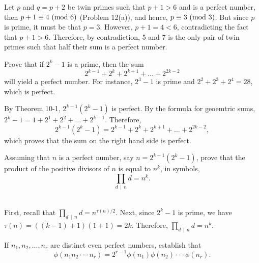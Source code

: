 \begin{solution}
    Let $p$ and $q = p+2$ be twin primes such that $p + 1 > 6$ and is a perfect number, then $p+ 1 \equiv 4 \ (\mathrm{mod}\ 6)$ (Problem 12(a)), and hence, $p \equiv 3 \ (\mathrm{mod}\ 3)$. But since $p$ is prime, it must be that $p = 3$. However, $p + 1 = 4 < 6$, contradicting the fact that $p + 1 > 6$. Therefore, by contradiction, 5 and 7 is the only pair of twin primes such that half their sum is a perfect number. \\
\end{solution}

\begin{exercise}
    Prove that if $2^k - 1$ is a prime, then the sum
    $$2^{k-1} + 2^k + 2^{k+1} + \dots + 2^{2k-2}$$
    will yield a perfect number. For instance, $2^3 - 1$ is prime and $2^2 + 2^3 + 2^4 = 28$, which is perfect. \\
\end{exercise}

\begin{solution}
    By Theorem 10-1, $2^{k-1}(2^k - 1)$ is perfect. By the formula for geoemtric sums, $2^k - 1 = 1 + 2^1 + 2^2 + \dots + 2^{k-1}$. Therefore, 
    $$2^{k-1}(2^k - 1) = 2^{k-1} + 2^k + 2^{k+1} + \dots + 2^{2k-2},$$
    which proves that the sum on the right hand side is perfect. \\
\end{solution}

\begin{exercise}
    Assuming that $n$ is a perfect number, say $n = 2^{k-1}(2^k - 1)$, prove that the product of the positive divisors of $n$ is equal to $n^k$, in symbols,
    $$\prod_{d \, \mid \, n}d = n^k.$$ \\
\end{exercise}

\begin{solution}
    First, recall that $\prod_{d \, \mid \, n}d = n^{\tau(n)/2}$. Next, since $2^k - 1$ is prime, we have $\tau(n) = ((k-1) + 1)(1 + 1) = 2k$. Therefore, $\prod_{d \, \mid \, n}d = n^k$. \\
\end{solution}

\begin{exercise}
    If $n_1, n_2, ..., n_r$ are distinct even perfect numbers, establish that
    $$\phi(n_1n_2 \cdot \cdot \cdot n_r) = 2^{r-1}\phi(n_1)\phi(n_2)\cdot \cdot \cdot \phi(n_r).$$
    \\
\end{exercise}

